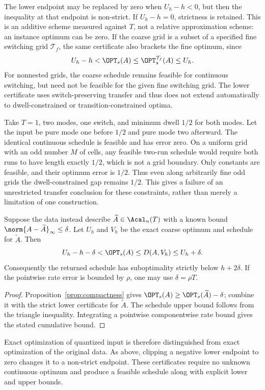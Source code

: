 The lower endpoint may be replaced by zero when $U_h-h<0$, but then the
inequality at that endpoint is non-strict. If $U_h-h=0$, strictness is
retained. This is an additive scheme measured against $T$, not a relative
approximation scheme: an instance optimum can be zero. If the coarse grid
is a subset of a specified fine switching grid $\mathcal T_f$, the same
certificate also brackets the fine optimum, since
\[
 U_h-h<\OPT_s(A)\le\OPT_s^{\mathcal T_f}(A)\le U_h.
\]
For nonnested grids, the coarse schedule remains feasible for continuous
switching, but need not be feasible for the given fine switching grid.
The lower certificate uses switch-preserving transfer and thus does not
extend automatically to dwell-constrained or transition-constrained optima.

\begin{example}\label{ex:dwell-grid-gap}
Take $T=1$, two modes, one switch, and minimum dwell $1/2$ for both modes.
Let the input be pure mode one before $1/2$ and pure mode two afterward.
The identical continuous schedule is feasible and has error zero. On a
uniform grid with an odd number $M$ of cells, any feasible two-run schedule
would require both runs to have length exactly $1/2$, which is not a grid
boundary. Only constants are feasible, and their optimum error is $1/2$.
Thus even along arbitrarily fine odd grids the dwell-constrained gap remains
$1/2$. This gives a failure of an unrestricted transfer conclusion for these
constraints, rather than merely a limitation of one construction.
\end{example}

\begin{corollary}\label{cor:coarse-perturbation}
Suppose the data instead describe $\widetilde A\in\Acal_n(T)$ with a known
bound $\norm{A-\widetilde A}_\infty\le\delta$. Let $U_h$ and $V_h$ be
the exact coarse optimum and schedule for $\widetilde A$. Then
\begin{equation}\label{eq:perturbed-certificate}
 U_h-h-\delta<\OPT_s(A)\le D(A,V_h)\le U_h+\delta.
\end{equation}
Consequently the returned schedule has suboptimality strictly below
$h+2\delta$. If the pointwise rate error is bounded by $\rho$, one may
use $\delta=\rho T$.
\end{corollary}
\begin{proof}
Proposition~\ref{prop:compactness} gives
$\OPT_s(A)\ge\OPT_s(\widetilde A)-\delta$; combine it with the strict
lower certificate for $\widetilde A$. The schedule upper bound follows
from the triangle inequality. Integrating a pointwise componentwise rate
bound gives the stated cumulative bound.
\end{proof}
Exact optimization of quantized input is therefore distinguished from exact
optimization of the original data. As above, clipping a negative lower
endpoint to zero changes it to a non-strict endpoint. These certificates
require no unknown continuous optimum and produce a feasible schedule
along with explicit lower and upper bounds.
